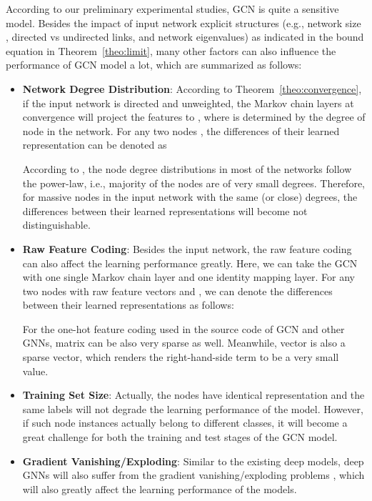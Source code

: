 \documentclass{article}
\newcommand{\gcn}{\textsc{GCN}}
\begin{document}
According to our preliminary experimental studies, {\gcn} is quite a sensitive model. Besides the impact of input network explicit structures (e.g., network size , directed vs undirected links, and network eigenvalues) as indicated in the bound equation in Theorem~\ref{theo:limit}, many other factors can also influence the performance of {\gcn} model a lot, which are summarized as follows:
\begin{itemize}

\item \textbf{Network Degree Distribution}: According to Theorem~\ref{theo:convergence}, if the input network  is directed and unweighted, the Markov chain layers at convergence will project the features to , where  is determined by the degree of node  in the network. For any two nodes , the differences of their learned representation can be denoted as 

According to \cite{power_law}, the node degree distributions in most of the networks follow the power-law, i.e., majority of the nodes are of very small degrees. Therefore, for massive nodes in the input network with the same (or close) degrees, the differences between their learned representations will become not distinguishable.

\item \textbf{Raw Feature Coding}: Besides the input network, the raw feature coding can also affect the learning performance greatly. Here, we can take the {\gcn} with one single Markov chain layer and one identity mapping layer. For any two nodes  with raw feature vectors  and , we can denote the differences between their learned representations as follows:

For the one-hot feature coding used in the source code of {\gcn} \cite{KW16} and other GNNs, matrix  can be also very sparse as well. Meanwhile, vector  is also a sparse vector, which renders the right-hand-side term to be a very small value.

\item \textbf{Training Set Size}: Actually, the nodes have identical representation and the same labels will not degrade the learning performance of the model. However, if such node instances actually belong to different classes, it will become a great challenge for both the training and test stages of the {\gcn} model. 

\item \textbf{Gradient Vanishing/Exploding}: Similar to the existing deep models, deep GNNs will also suffer from the gradient vanishing/exploding problems \cite{PMB12}, which will also greatly affect the learning performance of the models.

\end{itemize}
\end{document}
